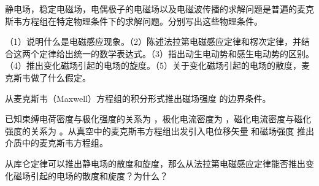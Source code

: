 \begin{question} 静电场，稳定电磁场，电偶极子的电磁场以及电磁波传播的求解问题是普遍的麦克斯韦方程组在特定物理条件下的求解问题。分别写出这些物理条件。
\end{question}

\begin{question} （1）说明什么是电磁感应现象。（2）陈述法拉第电磁感应定律和楞次定律，并结合这两个定律给出统一的数学表达式。（3）指出动生电动势和感生电动势的区别。（4）推出变化磁场引起的电场的旋度。（5）关于变化磁场引起的电场的散度，麦克斯韦做了什么假定。
\end{question}

\begin{question} 从麦克斯韦（Maxwell）方程组的积分形式推出磁场强度 的边界条件。
\end{question}

\begin{question} 已知束缚电荷密度与极化强度的关系为 ，极化电流密度为 ，磁化电流密度与磁化强度的关系为 。从真空中的麦克斯韦方程组出发引入电位移矢量 和磁场强度 推出介质中的麦克斯韦方程组。
\end{question}

\begin{question} 从库仑定律可以推出静电场的散度和旋度，那么从法拉第电磁感应定律能否推出变化磁场引起的电场的散度和旋度？为什么？
\end{question}